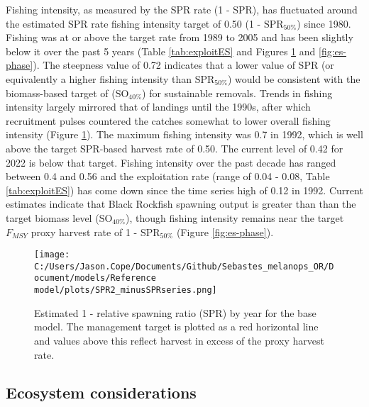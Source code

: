 \documentclass[11pt,
  english,
  letterpaper,
]{article}
\begin{document}
Fishing intensity, as measured by the SPR rate (1 - SPR), has fluctuated around the estimated SPR rate fishing intensity target of 0.50 (1 - \(\text{SPR}_{50\%}\)) since 1980. Fishing was at or above the target rate from 1989 to 2005 and has been slightly below it over the past 5 years (Table \ref{tab:exploitES} and Figures \ref{fig:es-1-spr} and \ref{fig:es-phase}). The steepness value of 0.72 indicates that a lower value of SPR (or equivalently a higher fishing intensity than \(\text{SPR}_{50\%}\)) would be consistent with the biomass-based target of (\(\text{SO}_{40\%}\)) for sustainable removals. Trends in fishing intensity largely mirrored that of landings until the 1990s, after which recruitment pulses countered the catches somewhat to lower overall fishing intensity (Figure \ref{fig:es-1-spr}). The maximum fishing intensity was 0.7 in 1992, which is well above the target SPR-based harvest rate of 0.50. The current level of 0.42 for 2022 is below that target. Fishing intensity over the past decade has ranged between 0.4 and 0.56 and the exploitation rate (range of 0.04 - 0.08, Table \ref{tab:exploitES}) has come down since the time series high of 0.12 in 1992. Current estimates indicate that Black Rockfish spawning output is greater than than the target biomass level (\(\text{SO}_{40\%}\)), though fishing intensity remains near the target \(F_{MSY}\) proxy harvest rate of 1 - \(\text{SPR}_{50\%}\) (Figure \ref{fig:es-phase}).



\begin{figure}
\centering
\texttt{[image: C:/Users/Jason.Cope/Documents/Github/Sebastes\_melanops\_OR/Document/models/Reference model/plots/SPR2\_minusSPRseries.png]}
\caption{Estimated 1 - relative spawning ratio (SPR) by year for the base model. The management target is plotted as a red horizontal line and values above this reflect harvest in excess of the proxy harvest rate.\label{fig:es-1-spr}}
\end{figure}

\clearpage

\hypertarget{ecosystem-considerations}{%
\subsection*{Ecosystem considerations}\label{ecosystem-considerations}}
\end{document}
